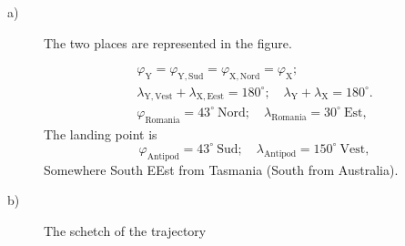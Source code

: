 \begin{description}
\item[a)] The two places are represented in the figure.


  \begin{gather*}
    \varphi_{\mathrm{Y}} = \varphi_{\mathrm{Y,Sud}}
      = \varphi_{\mathrm{X,Nord}} = \varphi_{\mathrm{X}}; \\
    \lambda_{\mathrm{Y,Vest}} + \lambda_{\mathrm{X,Eest}} = 180^\circ;\quad %
      \lambda_{\mathrm{Y}} + \lambda_{\mathrm{X}} = 180^\circ. \\
    \varphi_{\mathrm{Romania}} = 43^\circ\ \text{Nord};\quad %
      \lambda_{\mathrm{Romania}} = 30^\circ\ \text{Est},
  \end{gather*}
  The landing point is
  \[
    \varphi_{\mathrm{Antipod}} = 43^\circ\ \text{Sud};\quad
    \lambda_{\mathrm{Antipod}} = 150^\circ\ \text{Vest},
  \]
  Somewhere South EEst from Tasmania (South from Australia). %


\item[b)] The schetch of the trajectory %



\end{description}

